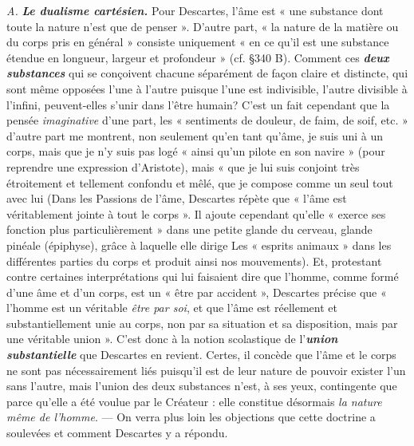 {\it A.} \textbf{\textit {Le dualisme cartésien.}} Pour Descartes, l’âme est « une
substance dont toute la nature n’est que de penser ». D’autre part,
« la nature de la matière ou du corps pris en général » consiste uniquement
« en ce qu’il est une substance étendue en longueur, largeur et
profondeur » (cf. \S 340 B). Comment ces \textbf{\textit {deux substances}} qui se
conçoivent chacune séparément de façon claire et distincte, qui sont
même opposées l’une à l’autre puisque l’une est indivisible, l’autre
divisible à l'infini, peuvent-elles s’unir dans l’être humain? C’est un
fait cependant que la pensée {\it imaginative} d’une part, les « sentiments
de douleur, de faim, de soif, etc. » d’autre part me montrent, non
seulement qu’en tant qu’âme, je suis uni à un corps, mais que je n'y
suis pas logé « ainsi qu’un pilote en son navire » (pour reprendre une
expression d’Aristote), mais « que je lui suis conjoint très étroitement
et tellement confondu et mêlé, que je compose comme un seul tout
avec lui
{\scriptsize (Dans les Passions de l'âme, Descartes répète que « l'âme est véritablement jointe
à tout le corps ». Il ajoute cependant qu'elle « exerce ses fonction plus particulièrement »
dans une petite glande du cerveau, glande pinéale (épiphyse), grâce à laquelle elle
dirige Les « esprits animaux » dans les différentes parties du corps et produit ainsi nos
mouvements)}. Et, protestant contre certaines interprétations qui lui
faisaient dire que l’homme, comme formé d’une âme et d’un corps,
est un « être par accident », Descartes précise que « l’homme est un
véritable {\it être par soi}, et que l’âme est réellement et substantiellement
unie au corps, non par sa situation et sa disposition, mais par une
véritable union ». C’est donc à la notion scolastique de l’\textbf{\textit {union substantielle}}
que Descartes en revient. Certes, il concède que l’âme et
le corps ne sont pas nécessairement liés puisqu'il est de leur nature
de pouvoir exister l’un sans l’autre, mais l’union des deux substances
n’est, à ses yeux, contingente que parce qu’elle a été voulue par le
Créateur : elle constitue désormais {\it la nature même de l’homme}. — On
verra plus loin les objections que cette doctrine a soulevées et comment
Descartes y a répondu.

